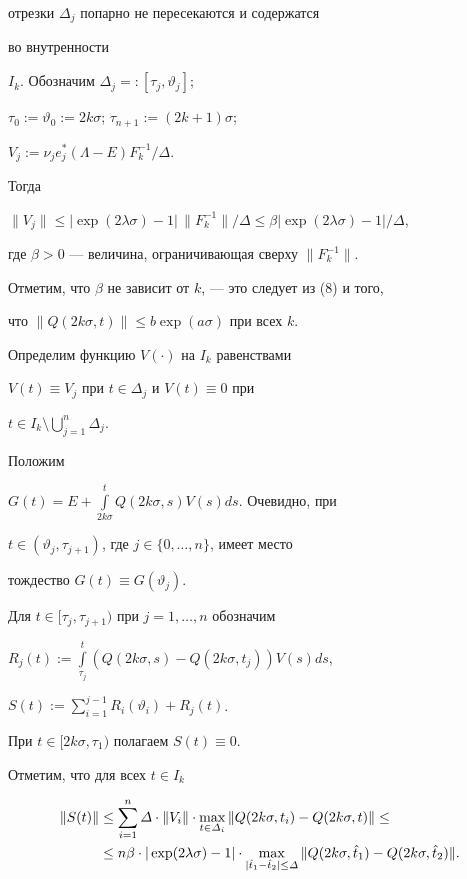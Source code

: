 отрезки $\varDelta_{j}$ попарно не пересекаются и содержатся


во внутренности


$I_k$. Обозначим $\varDelta_{j}=:[\tau_j,\vartheta_j]$;


$\tau_{0}:=\vartheta_{0}:=2k\sigma$; $\tau_{n+1}:=(2k+1)\sigma$;


$V_j:=\nu_j e^*_j(\Lambda-E)F_k^{-1}/\varDelta$.


Тогда


$\|V_j\|\le|\exp(2\lambda\sigma)-1|\,\|F_k^{-1}\|/\varDelta\le


\beta|\exp(2\lambda\sigma)-1|/\varDelta$,


где $\beta>0$ --- величина, ограничивающая сверху $\|F_k^{-1}\|$.


Отметим, что $\beta$ не зависит от $k$, --- это следует из (8) и того,


что $\|Q(2k\sigma,t)\|\le b\exp(a\sigma)$ при всех $k$.





Определим функцию $V(\cdot)$ на $I_k$ равенствами


$V(t)\equiv V_{j}$ при $t\in\varDelta_{j}$ и $V(t)\equiv 0$ при


$t\in I_k\setminus\bigcup\limits_{j=1}^{n}\varDelta_{j}$.


Положим


$G(t)=E+\int\limits_{2k\sigma}^{t}Q(2k\sigma,s)V(s)ds$. Очевидно, при


$t\in(\vartheta_{j},\tau_{j+1})$, где $j\in\{0,\dotsc,n\}$, имеет место


тождество $G(t)\equiv G(\vartheta_{j})$.





Для $t\in [\tau_{j},\tau_{j+1})$ при $j=1,\dotsc,n$ обозначим


$R_j(t):=\int\limits_{\tau_j}^{t}(Q(2k\sigma,s)-Q(2k\sigma,t_j))V(s)ds$,


$S(t):=\sum\limits_{i=1}^{j-1}R_i(\vartheta_i)+R_j(t)$.


При $t\in [2k\sigma,\tau_{1})$ полагаем $S(t)\equiv 0$.


Отметим, что для всех $t\in I_{k}$


\begin{align}


\|S(t)\|&\le\sum\limits_{i=1}^{n}\varDelta\cdot\|V_i\|\cdot


\max_{t\in\varDelta_i}\|Q(2k\sigma,t_i)-Q(2k\sigma,t)\|\le\notag\\


%


&\le n\beta\cdot|\exp(2\lambda\sigma)-1|\cdot


\max\limits_{|\hat t_1-\hat t_2|\le\varDelta}


\|Q(2k\sigma,\hat t_1)-Q(2k\sigma,\hat t_2)\|.


\end{align}


